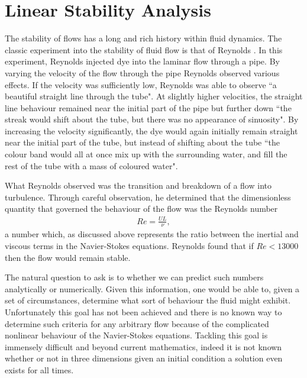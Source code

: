 \section{Linear Stability Analysis}
The stability of flows has a long and rich history within fluid dynamics. The classic experiment into the stability of fluid flow is that of  Reynolds \cite{reynolds1883}. In this experiment, Reynolds injected dye into the laminar flow through a pipe. By varying the velocity of the flow through the pipe Reynolds observed various effects. If the velocity was sufficiently low, Reynolds was able to observe ``a beautiful straight line through the tube". At slightly higher velocities, the straight line behaviour remained near the initial part of the pipe but further down ``the streak would shift about the tube, but there was no appearance of sinuosity". By increasing the velocity significantly, the dye would again initially remain straight near the initial part of the tube, but instead of shifting about the tube ``the colour band would all at once mix up with the surrounding water, and fill the rest of the tube with a mass of coloured water". 

What Reynolds observed was the transition and breakdown of a flow into turbulence. Through careful observation, he determined that the dimensionless quantity that governed the behaviour of the flow was the Reynolds number 
\begin{align}
Re =\frac{UL}{\nu},
\end{align}
a number which, as discussed above represents the ratio between the inertial and viscous terms in the Navier-Stokes equations. Reynolds found that if $Re<13000$ then the flow would remain stable. 

The natural question to ask is to whether we can predict such numbers analytically or numerically. Given this information, one would be able to, given a set of circumstances, determine what sort of behaviour the fluid might exhibit. Unfortunately this goal has not been achieved and there is no known way to determine such criteria for any arbitrary flow because of the complicated nonlinear behaviour of the Navier-Stokes equations. Tackling this goal is immensely difficult and beyond current mathematics, indeed it is not known whether or not in three dimensions given an initial condition a solution even exists for all times.

